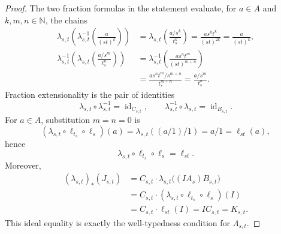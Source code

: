 \begin{proof}
  The two fraction formulas in the statement evaluate, for
  $a\in A$ and $k,m,n\in\mathbb N$, the chains
  \[
  \begin{aligned}
    \lambda_{s,t}\!\left(
      \lambda_{s,t}^{-1}\!\left(\frac a{(st)^k}\right)\right)
      &=\lambda_{s,t}\!\left(\frac{a/s^k}{t_s^k}\right)
       =\frac{as^kt^k}{(st)^{2k}}
       =\frac a{(st)^k},\\
    \lambda_{s,t}^{-1}\!\left(
      \lambda_{s,t}\!\left(\frac{a/s^m}{t_s^n}\right)\right)
      &=\lambda_{s,t}^{-1}\!\left(
        \frac{as^nt^m}{(st)^{m+n}}\right)\\
      &=\frac{as^nt^m/s^{m+n}}{t_s^{m+n}}
       =\frac{a/s^m}{t_s^n}.
  \end{aligned}
  \]
  Fraction extensionality is the pair of identities
  \[
    \lambda_{s,t}\circ\lambda_{s,t}^{-1}
      =\operatorname{id}_{C_{s,t}},
    \qquad
    \lambda_{s,t}^{-1}\circ\lambda_{s,t}
      =\operatorname{id}_{B_{s,t}}.
  \]
  For $a\in A$, substitution $m=n=0$ is
  \[
    (\lambda_{s,t}\circ\ell_{t_s}\circ\ell_s)(a)
      =\lambda_{s,t}((a/1)/1)
      =a/1
      =\ell_{st}(a),
  \]
  hence
  \[
    \lambda_{s,t}\circ\ell_{t_s}\circ\ell_s=\ell_{st}.
  \]
  Moreover,
  \[
  \begin{aligned}
    (\lambda_{s,t})_*(J_{s,t})
      &=C_{s,t}\cdot
        \lambda_{s,t}\bigl((IA_s)B_{s,t}\bigr)\\
      &=C_{s,t}\cdot
        (\lambda_{s,t}\circ\ell_{t_s}\circ\ell_s)(I)\\
      &=C_{s,t}\cdot\ell_{st}(I)
       =IC_{s,t}=K_{s,t}.
  \end{aligned}
  \]
  This ideal equality is exactly the well-typedness condition for
  $\Lambda_{s,t}$.


\end{proof}

